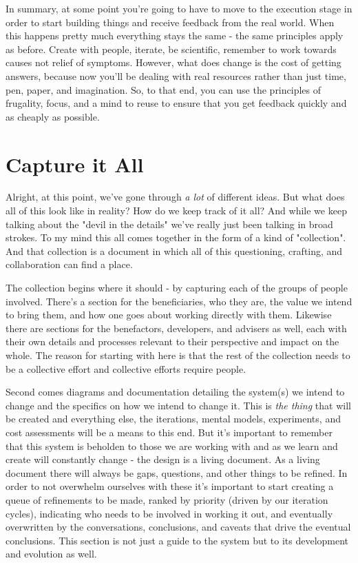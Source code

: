 \documentclass[11pt,a5paper]{book}
\begin{document}
In summary, at some point you're going to have to move to the execution stage in order to start building things and receive feedback from the real world. When this happens pretty much everything stays the same - the same principles apply as before. Create with people, iterate, be scientific, remember to work towards causes not relief of symptoms. However, what does change is the cost of getting answers, because now you'll be dealing with real resources rather than just time, pen, paper, and imagination. So, to that end, you can use the principles of frugality, focus, and a mind to reuse to ensure that you get feedback quickly and as cheaply as possible. 

\section{Capture it All}
Alright, at this point, we've gone through \textit{a lot} of different ideas. But what does all of this look like in reality? How do we keep track of it all? And while we keep talking about the "devil in the details" we've really just been talking in broad strokes. To my mind this all comes together in the form of a kind of "collection". And that collection is a document in which all of this questioning, crafting, and collaboration can find a place.
\newline

The collection begins where it should - by capturing each of the groups of people involved. There's a section for the beneficiaries, who they are, the value we intend to bring them, and how one goes about working directly with them. Likewise there are sections for the benefactors, developers, and advisers as well, each with their own details and processes relevant to their perspective and impact on the whole. The reason for starting with here is that the rest of the collection needs to be a collective effort and collective efforts require people.
\newline

Second comes diagrams and documentation detailing the system(s) we intend to change and the specifics on how we intend to change it. This is \textit{the thing} that will be created and everything else, the iterations, mental models, experiments, and cost assessments will be a means to this end. But it's important to remember that this system is beholden to those we are working with and as we learn and create will constantly change - the design is a living document. As a living document there will always be gaps, questions, and other things to be refined. In order to not overwhelm ourselves with these it's important to start creating a queue of refinements to be made, ranked by priority (driven by our iteration cycles), indicating who needs to be involved in working it out, and eventually overwritten by the conversations, conclusions, and caveats that drive the eventual conclusions. This section is not just a guide to the system but to its development and evolution as well.
\newline
\end{document}
